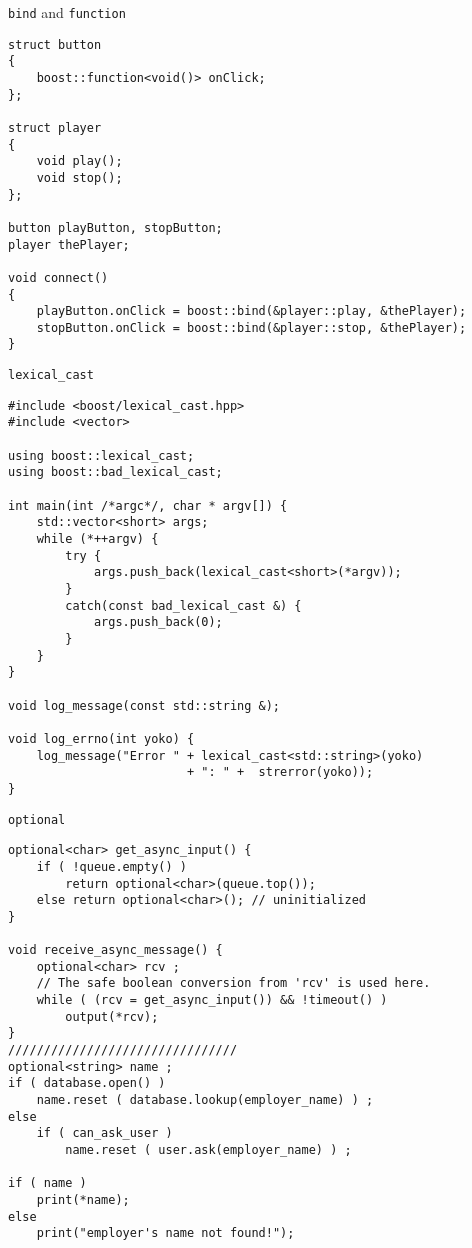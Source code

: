 \documentclass{beamer}
\begin{document}
\begin{frame}[fragile]{{\tt bind} and {\tt function}}
\small
\begin{lstlisting}
struct button 
{
    boost::function<void()> onClick;
};

struct player
{
    void play();
    void stop();
};

button playButton, stopButton;
player thePlayer;

void connect()
{
    playButton.onClick = boost::bind(&player::play, &thePlayer);
    stopButton.onClick = boost::bind(&player::stop, &thePlayer);
}

\end{lstlisting}
\end{frame}

\begin{frame}[fragile]{{\tt lexical\_cast}}
\small
\begin{lstlisting}
#include <boost/lexical_cast.hpp>
#include <vector>

using boost::lexical_cast;
using boost::bad_lexical_cast;

int main(int /*argc*/, char * argv[]) {
    std::vector<short> args;
    while (*++argv) {
        try {
            args.push_back(lexical_cast<short>(*argv));
        }
        catch(const bad_lexical_cast &) {
            args.push_back(0);
        }
    }
} 

void log_message(const std::string &);

void log_errno(int yoko) {
    log_message("Error " + lexical_cast<std::string>(yoko) 
                         + ": " +  strerror(yoko));
}
\end{lstlisting}
\end{frame}


\begin{frame}[fragile]{{\tt optional}}
\small
\begin{lstlisting}
optional<char> get_async_input() {
    if ( !queue.empty() )
        return optional<char>(queue.top());
    else return optional<char>(); // uninitialized
}

void receive_async_message() {
    optional<char> rcv ;
    // The safe boolean conversion from 'rcv' is used here.
    while ( (rcv = get_async_input()) && !timeout() )
        output(*rcv);
}
////////////////////////////////
optional<string> name ;
if ( database.open() )
    name.reset ( database.lookup(employer_name) ) ;
else
    if ( can_ask_user )
        name.reset ( user.ask(employer_name) ) ;

if ( name )
    print(*name);
else 
    print("employer's name not found!");
\end{lstlisting}
\end{frame}
\end{document}
